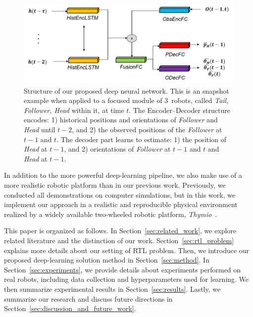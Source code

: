 \documentclass[letterpaper, 10 pt, conference]{ieeeconf}  %
\begin{document}
	\begin{figure}\centering
		\includegraphics[width=1.\columnwidth]{fig_DL_Pipeline}
		\caption{Structure of our proposed deep neural network.
			This is an snapshot example when applied to a focused module of
			$3$~robots, called \emph{Tail, Follower, Head} within it, at time $t$.
            The Encoder--Decoder structure encodes: 1) historical
            positions and orientations of \emph{Follower} and \emph{Head}
            until $t-2$, and 2) the observed positions of the \emph{Follower} at
            $t-1$ and $t$. The decoder part learns to estimate: 1) the
            position of \emph{Head} at $t-1$, and 2) orientations of
            \emph{Follower} at $t-1$ and $t$ and \emph{Head} at $t-1$.
		}
		\label{fig:DL_Pipeline}
	\end{figure}
    In addition to the more powerful deep-learning pipeline, we also
    make use of a more realistic robotic platform than in our previous
    work. Previously, we conducted all demonstrations on computer
    simulations, but in this work, we implement our approach in a
    realistic and reproducible physical environment realized by a widely
    available two-wheeled robotic platform, \emph{Thymio}~\cite{Shin14}.


    This paper is organized as follows. In
    Section~\ref{sec:related_work}, we explore related literature and
    the distinction of our work. Section~\ref{sec:rtl_problem} explains
    more details about our setting of RTL problem. Then, we introduce
    our proposed deep-learning solution method in
    Section~\ref{sec:method}. In Section~\ref{sec:experiments}, we
    provide details about experiments performed on real robots,
    including data collection and hyperparameters used for learning. We
    then summarize experimental results in Section~\ref{sec:results}.
    Lastly, we summarize our research and discuss future directions in
    Section~\ref{sec:discussion_and_future_work}.
\end{document}
